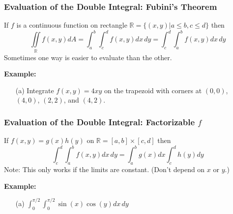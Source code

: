 \documentclass{beamer}
\begin{document}
\begin{frame}
\frametitle{\textbf{Evaluation of the Double Integral: Fubini's Theorem}}
If $f$ is a continuous function on rectangle $\mathbb{R} = \{(x,y)|a\leq b, c\leq d \}$ then
$$\iint\limits_{\mathbb{R}} f(x,y)dA = \int_a^b \int_c^d f(x,y)dx\,dy = \int_c^d \int_a^b  f(x,y)dx\,dy $$
Sometimes one way is easier to evaluate than the other.\\
\vspace{12pt}

\textbf{Example:}

\begin{itemize}
	\item[(a)] Integrate $f(x,y) = 4xy$ on the trapezoid with corners at $(0,0)$, $(4,0)$, $(2,2)$, and $(4,2)$.
\end{itemize}
\end{frame}

\begin{frame}
\frametitle{\textbf{Evaluation of the Double Integral: Factorizable $f$}}
If $f(x,y) = g(x)h(y)$ on $\mathbb{R} = [a,b] \times [c,d]$ then
$$\int_c^d \int_a^b f(x,y) dx\,dy = \int_a^bg(x)dx \int_c^d h(y)dy$$
Note: This only works if the limits are constant. (Don't depend on $x$ or $y$.)
\vspace{12pt}

\textbf{Example:}
\begin{itemize}
	\item[(a)] $\int_0^{\pi/2} \int_0^{\pi/2} \sin(x) \cos(y) dx \,dy$
\end{itemize}
\end{frame}
\end{document}

